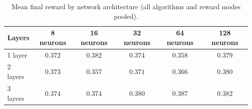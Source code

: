 \begin{table}[htbp]
\centering
\caption{Mean final reward by network architecture (all algorithms and reward modes pooled).}
\label{tab:network_size}
\begin{tabular}{lccccc}
\toprule
Layers & 8 neurons & 16 neurons & 32 neurons & 64 neurons & 128 neurons \\
\midrule
1 layer  & $0.372$ & $0.382$ & $0.374$ & $0.358$ & $0.379$ \\
2 layers & $0.373$ & $0.357$ & $0.371$ & $0.366$ & $0.380$ \\
3 layers & $0.374$ & $0.374$ & $0.380$ & $0.387$ & $0.382$ \\
\bottomrule
\end{tabular}
\end{table}